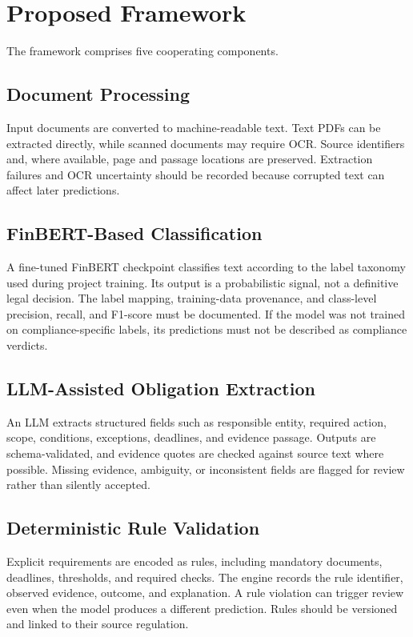\documentclass[conference]{IEEEtran}
\begin{document}
\section{Proposed Framework}
The framework comprises five cooperating components.

\subsection{Document Processing}
Input documents are converted to machine-readable text. Text PDFs can be extracted directly, while scanned documents may require OCR. Source identifiers and, where available, page and passage locations are preserved. Extraction failures and OCR uncertainty should be recorded because corrupted text can affect later predictions.

\subsection{FinBERT-Based Classification}
A fine-tuned FinBERT checkpoint classifies text according to the label taxonomy used during project training. Its output is a probabilistic signal, not a definitive legal decision. The label mapping, training-data provenance, and class-level precision, recall, and F1-score must be documented. If the model was not trained on compliance-specific labels, its predictions must not be described as compliance verdicts.

\subsection{LLM-Assisted Obligation Extraction}
An LLM extracts structured fields such as responsible entity, required action, scope, conditions, exceptions, deadlines, and evidence passage. Outputs are schema-validated, and evidence quotes are checked against source text where possible. Missing evidence, ambiguity, or inconsistent fields are flagged for review rather than silently accepted.

\subsection{Deterministic Rule Validation}
Explicit requirements are encoded as rules, including mandatory documents, deadlines, thresholds, and required checks. The engine records the rule identifier, observed evidence, outcome, and explanation. A rule violation can trigger review even when the model produces a different prediction. Rules should be versioned and linked to their source regulation.
\end{document}
